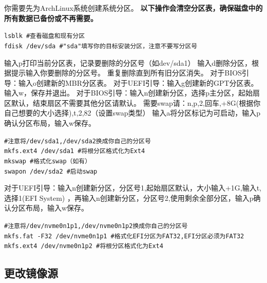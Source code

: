 \documentclass{article}
\newenvironment{singlecolumn}{%
	\par
	\noindent
	\begin{minipage}[t]{\textwidth}
		\setlength{\parfillskip}{0pt plus 1fil}
	}{%
	\end{minipage}
	\par
}
\begin{document}
\begin{singlecolumn}
你需要先为ArchLinux系统创建系统分区。 
\textcolor{code}{\textbf{以下操作会清空分区表，确保磁盘中的所有数据已备份或不再需要。} }
\begin{tcolorbox}[
	title=bash,
	boxrule=1pt,
	fonttitle=\bfseries,
	listing only, 
	listing options={language=bash}
	]
	\verb|lsblk #查看磁盘和现有分区|\\
	\verb|fdisk /dev/sda #"sda"填写你的目标安装分区，注意不要写分区号|\\
\end{tcolorbox}
输入p打印当前分区表，记录要删除的分区号（如dev/sda1）
输入d删除分区，根据提示输入你要删除的分区号。
重复删除直到所有旧分区消失。
\textcolor{bios}{对于BIOS引导：输入o创建新的MBR分区表。}
\textcolor{uefi}{对于UEFI引导：输入g创建新的GPT分区表。}
输入\textcolor{code}{w}，保存并退出。
\textcolor{bios}{对于BIOS引导：输入n创建新分区，选择p主分区，起始扇区默认，结束扇区不需要其他分区请默认。
需要swap请：\textcolor{code}{n,p,2,回车,+8G(根据你自己想要的大小选择),t,2,82（设置swap类型）
输入a将分区标记为可启动，输入p确认分区布局，输入w保存。}}\\
\begin{tcolorbox}[
	title=bash,
	boxrule=1pt,
	fonttitle=\bfseries,
	listing only, 
	listing options={language=bash}
	]
	\verb|#注意将/dev/sda1,/dev/sda2换成你自己的分区号|\\
	\verb|mkfs.ext4 /dev/sda1 #将根分区格式化为Ext4|\\
	\verb|mkswap #格式化swap（如有）|\\
	\verb|swapon /dev/sda2 #启动swap|\\
\end{tcolorbox}
\textcolor{uefi}{对于UEFI引导：输入n创建新分区，分区号1,起始扇区默认，大小输入+1G,输入t,选择1(EFI System) ，再输入n创建新分区，分区号2,使用剩余全部分区，输入p确认分区布局，输入w保存。}\\
\begin{tcolorbox}[
	title=bash,
	boxrule=1pt,
	fonttitle=\bfseries,
	listing only, 
	listing options={language=bash}
	]
	\verb|#注意将/dev/nvme0n1p1,/dev/nvme0n1p2换成你自己的分区号|\\
	\verb|mkfs.fat -F32 /dev/nvme0n1p1 #格式化EFI分区为FAT32,EFI分区必须为FAT32|\\
	\verb|mkfs.ext4 /dev/nvme0n1p2 #将根分区格式化为Ext4|\\
\end{tcolorbox}

\medskip

\begin{tcolorbox}
\section*{更改镜像源}
\end{tcolorbox}


\end{singlecolumn}
\end{document}
